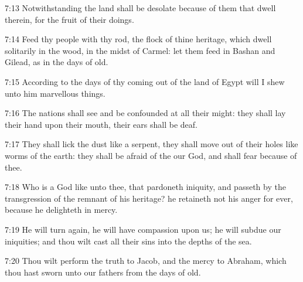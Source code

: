 7:13 Notwithstanding the land shall be desolate because of them that
dwell therein, for the fruit of their doings.

7:14 Feed thy people with thy rod, the flock of thine heritage, which
dwell solitarily in the wood, in the midst of Carmel: let them feed in
Bashan and Gilead, as in the days of old.

7:15 According to the days of thy coming out of the land of Egypt will
I shew unto him marvellous things.

7:16 The nations shall see and be confounded at all their might: they
shall lay their hand upon their mouth, their ears shall be deaf.

7:17 They shall lick the dust like a serpent, they shall move out of
their holes like worms of the earth: they shall be afraid of the \LORD
our God, and shall fear because of thee.

7:18 Who is a God like unto thee, that pardoneth iniquity, and passeth
by the transgression of the remnant of his heritage? he retaineth not
his anger for ever, because he delighteth in mercy.

7:19 He will turn again, he will have compassion upon us; he will
subdue our iniquities; and thou wilt cast all their sins into the
depths of the sea.

7:20 Thou wilt perform the truth to Jacob, and the mercy to Abraham,
which thou hast sworn unto our fathers from the days of old.

